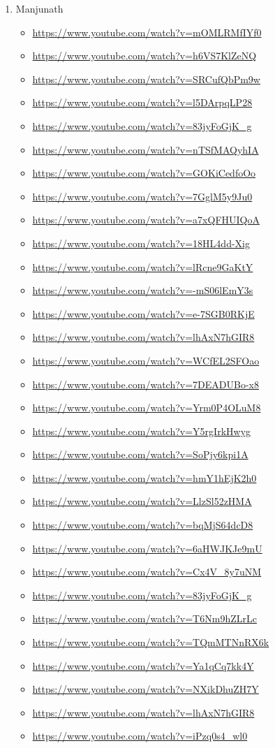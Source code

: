 \begin{enumerate}
\item Manjunath
\label{sec:org6ecceef}
\begin{itemize}
\item \url{https://www.youtube.com/watch?v=mOMLRMfIYf0}
\item \url{https://www.youtube.com/watch?v=h6VS7KlZeNQ}
\item \url{https://www.youtube.com/watch?v=SRCufQbPm9w}
\item \url{https://www.youtube.com/watch?v=l5DArpqLP28}
\item \url{https://www.youtube.com/watch?v=83jyFoGjK\_g}
\item \url{https://www.youtube.com/watch?v=nTSfMAQyhIA}
\item \url{https://www.youtube.com/watch?v=GOKiCedfoOo}
\item \url{https://www.youtube.com/watch?v=7GglM5y9Ju0}
\item \url{https://www.youtube.com/watch?v=a7xQFHUIQoA}
\item \url{https://www.youtube.com/watch?v=18HL4dd-Xig}
\item \url{https://www.youtube.com/watch?v=lRcne9GaKtY}
\item \url{https://www.youtube.com/watch?v=-mS06lEmY3s}
\item \url{https://www.youtube.com/watch?v=e-7SGB0RKjE}
\item \url{https://www.youtube.com/watch?v=lhAxN7hGIR8}
\item \url{https://www.youtube.com/watch?v=WCfEL2SFOao}
\item \url{https://www.youtube.com/watch?v=7DEADUBo-x8}
\item \url{https://www.youtube.com/watch?v=Yrm0P4OLuM8}
\item \url{https://www.youtube.com/watch?v=Y5rgIrkHwyg}
\item \url{https://www.youtube.com/watch?v=SoPjy6kpi1A}
\item \url{https://www.youtube.com/watch?v=hmY1hEjK2h0}
\item \url{https://www.youtube.com/watch?v=LlzSl52zHMA}
\item \url{https://www.youtube.com/watch?v=bqMjS64dcD8}
\item \url{https://www.youtube.com/watch?v=6aHWJKJe9mU}
\item \url{https://www.youtube.com/watch?v=Cx4V\_8y7uNM}
\item \url{https://www.youtube.com/watch?v=83jyFoGjK\_g}
\item \url{https://www.youtube.com/watch?v=T6Nm9hZLrLc}
\item \url{https://www.youtube.com/watch?v=TQmMTNnRX6k}
\item \url{https://www.youtube.com/watch?v=Ya1qCq7kk4Y}
\item \url{https://www.youtube.com/watch?v=NXikDhuZH7Y}
\item \url{https://www.youtube.com/watch?v=lhAxN7hGIR8}
\item \url{https://www.youtube.com/watch?v=iPzq0s4\_wl0}
\end{itemize}


\end{enumerate}
